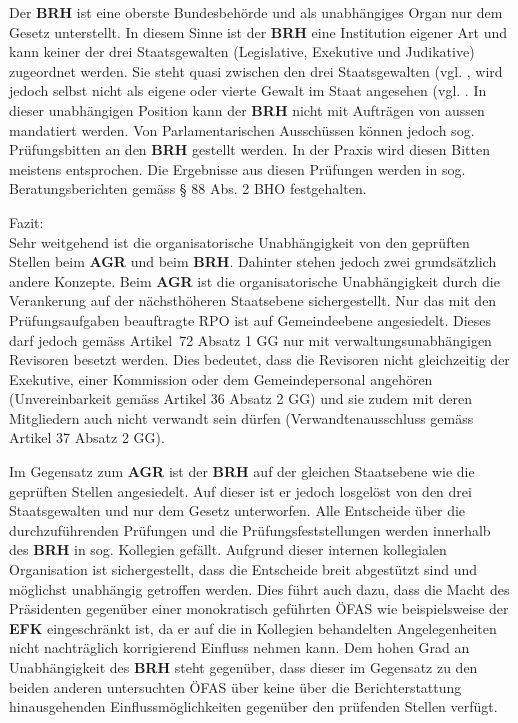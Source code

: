 \documentclass[10pt]{article}
\begin{document}
Der \textbf{BRH} ist eine oberste Bundesbehörde und als unabhängiges Organ nur dem Gesetz unterstellt. In diesem Sinne ist der \textbf{BRH} eine Institution eigener Art und kann keiner der drei Staatsgewalten (Legislative, Exekutive und Judikative) zugeordnet werden. Sie steht quasi zwischen den drei Staatsgewalten (vgl. \cite[S. 389]{Koller2002}, wird jedoch selbst nicht als eigene oder vierte Gewalt im Staat angesehen (vgl. \cite[S. 401]{Koller2002}. In dieser unabhängigen Position kann der \textbf{BRH} nicht mit Aufträgen von aussen mandatiert werden. Von Parlamentarischen Ausschüssen können jedoch sog. Prüfungsbitten an den \textbf{BRH} gestellt werden. In der Praxis wird diesen Bitten meistens entsprochen. Die Ergebnisse aus diesen Prüfungen werden in sog. Beratungsberichten gemäss § 88 Abs. 2 BHO festgehalten.

Fazit:\\
Sehr weitgehend ist die organisatorische Unabhängigkeit von den geprüften Stellen beim \textbf{AGR} und beim \textbf{BRH}. Dahinter stehen jedoch zwei grundsätzlich andere Konzepte. Beim \textbf{AGR} ist die organisatorische Unabhängigkeit durch die Verankerung auf der nächsthöheren Staatsebene sichergestellt. Nur das mit den Prüfungsaufgaben beauftragte RPO ist auf Gemeindeebene angesiedelt. Dieses darf jedoch gemäss Artikel~72 Absatz 1 GG nur mit verwaltungsunabhängigen Revisoren besetzt werden. Dies bedeutet, dass die Revisoren nicht gleichzeitig der Exekutive, einer Kommission oder dem Gemeinde­personal angehören (Unvereinbarkeit gemäss Artikel 36 Absatz 2 GG) und sie zudem mit deren Mitgliedern auch nicht verwandt sein dürfen (Verwandtenausschluss gemäss Artikel 37 Absatz 2 GG).

Im Gegensatz zum \textbf{AGR} ist der \textbf{BRH} auf der gleichen Staatsebene wie die geprüften Stellen angesiedelt. Auf dieser ist er jedoch losgelöst von den drei Staatsgewalten und nur dem Gesetz unterworfen. Alle Entscheide über die durchzuführenden Prüfungen und die Prüfungsfeststellungen werden innerhalb des \textbf{BRH} in sog. Kollegien gefällt. Aufgrund dieser internen kollegialen Organisation ist sichergestellt, dass die Entscheide breit abgestützt sind und möglichst unabhängig getroffen werden. Dies führt auch dazu, dass die Macht des Präsidenten gegenüber einer monokratisch geführten ÖFAS wie beispielsweise der \textbf{EFK} eingeschränkt ist, da er auf die in Kollegien behandelten Angelegenheiten nicht nachträglich korrigierend Einfluss nehmen kann. Dem hohen Grad an Unabhängigkeit des \textbf{BRH} steht gegenüber, dass dieser im Gegensatz zu den beiden anderen untersuchten ÖFAS über keine über die Berichterstattung hinausgehenden Einflussmöglichkeiten gegenüber den prüfenden Stellen verfügt.
\end{document}
